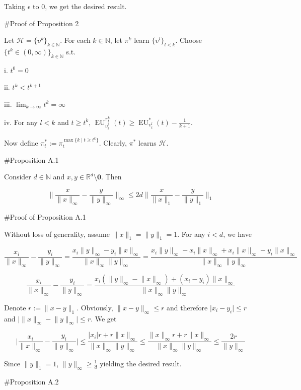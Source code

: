 \documentclass[a4paper]{article}
\newcommand{\Nats}{\mathbb{N}}
\newcommand{\Reals}{\mathbb{R}}
\newcommand{\Abs}[1]{\lvert #1 \rvert}
\newcommand{\Norm}[1]{\lVert #1 \rVert}
\newcommand{\Hy}{\mathcal{H}}
\newcommand{\EU}{\operatorname{EU}}
\begin{document}
Taking $\epsilon$ to 0, we get the desired result.

\#Proof of Proposition 2

Let $\Hy = \{\upsilon^k\}_{k \in \Nats}$. For each $k \in \Nats$, let $\pi^k$ learn $\{\upsilon^l\}_{l < k}$. Choose $\{t^k \in (0,\infty)\}_{k \in \Nats}$ s.t.

i. $t^0 = 0$

ii. $t^k < t^{k+1}$

iii. $\lim_{k \rightarrow \infty} t^k = \infty$

iv. For any $l < k$ and $t \geq t^k$, $\EU_{\upsilon^l_t}^{\pi^k_t}(t) \geq \EU_{\upsilon^l_t}^*(t) - \frac{1}{k+1}$.

Now define $\pi^*_t:=\pi_t^{\max\{k \mid t \geq t^k\}}$. Clearly, $\pi^*$ learns $\Hy$.

\#Proposition A.1

Consider $d \in \Nats$ and $x,y \in \Reals^d \setminus \boldsymbol{0}$. Then

$$\Norm{\frac{x}{\Norm{x}_\infty}-\frac{y}{\Norm{y}_\infty}}_\infty \leq2d \Norm{\frac{x}{\Norm{x}_1}-\frac{y}{\Norm{y}_1}}_1$$

\#Proof of Proposition A.1

Without loss of generality, assume $\Norm{x}_1 = \Norm{y}_1 = 1$. For any $i < d$, we have

$$\frac{x_i}{\Norm{x}_\infty} - \frac{y_i}{\Norm{y}_\infty} = \frac{x_i\Norm{y}_\infty-y_i\Norm{x}_\infty}{\Norm{x}_\infty\Norm{y}_\infty} = \frac{x_i\Norm{y}_\infty - x_i\Norm{x}_\infty + x_i\Norm{x}_\infty - y_i\Norm{x}_\infty}{\Norm{x}_\infty\Norm{y}_\infty}$$

$$\frac{x_i}{\Norm{x}_\infty} - \frac{y_i}{\Norm{y}_\infty} = \frac{x_i(\Norm{y}_\infty - \Norm{x}_\infty) + (x_i - y_i)\Norm{x}_\infty}{\Norm{x}_\infty\Norm{y}_\infty}$$

Denote $r:=\Norm{x-y}_1$. Obviously, $\Norm{x-y}_\infty \leq r$ and therefore $\Abs{x_i-y_i} \leq r$ and $\Abs{\Norm{x}_\infty - \Norm{y}_\infty} \leq r$. We get

$$\Abs{\frac{x_i}{\Norm{x}_\infty} - \frac{y_i}{\Norm{y}_\infty}} \leq \frac{\Abs{x_i}r + r\Norm{x}_\infty}{\Norm{x}_\infty\Norm{y}_\infty} \leq \frac{\Norm{x}_\infty r + r\Norm{x}_\infty}{\Norm{x}_\infty\Norm{y}_\infty} \leq \frac{2r}{\Norm{y}_\infty}$$

Since $\Norm{y}_1 = 1$, $\Norm{y}_\infty \geq \frac{1}{d}$ yielding the desired result.

\#Proposition A.2
\end{document}
